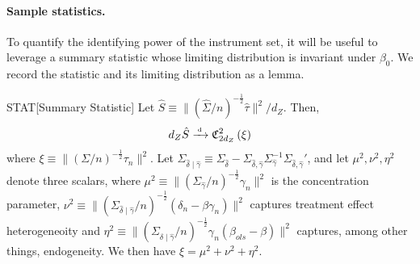 \paragraph*{Sample statistics.}
To quantify the identifying power of the instrument set, it will be useful to leverage a summary statistic whose limiting distribution is invariant under \(\beta_0\). We record the statistic and its limiting distribution as a lemma.
\begin{lemmap}{STAT}[Summary Statistic]\label{lem:stat}
Let \(\hat S \equiv \lVert (\hat\Sigma/n)^{-\frac{1}{2}}\hat \tau\rVert^2/d_Z\). 
Then,
\begin{align*}
    d_Z\hat S  \xrightarrow{{\scriptscriptstyle \mathrm{\;d\;}}} \mathfrak{C}^2_{2d_Z}\left(\xi\right)
\end{align*} 
where \(\xi \equiv \lVert (\Sigma/n)^{-\frac{1}{2}}\tau_n\rVert^2\). 
Let  \( \Sigma_{\hat\delta \mid \hat\gamma} \equiv  \Sigma_{\hat \delta} - \Sigma_{\hat \delta,\hat \gamma} \Sigma_{\hat \gamma}^{-1}\Sigma_{\hat \delta,\hat \gamma}' \), and let \(\mu^2, \nu^2, \eta^2\) denote three scalars, where \(\mu^2\equiv \lVert  (\Sigma_{\hat \gamma}/n)^{-\frac{1}{2}}\gamma_n\rVert^2\) is the concentration parameter, \(\nu^2 \equiv \lVert (\Sigma_{\hat\delta \mid \hat\gamma}/n)^{-\frac{1}{2}} (\delta_n-\beta\gamma_n)\rVert^2\) captures treatment effect heterogeneoity and \(\eta^2 \equiv\lVert (\Sigma_{\hat\delta \mid \hat\gamma}/n)^{-\frac{1}{2}}\gamma_n(\beta_{ols}-\beta)\rVert^2\) captures, among other things, endogeneity. We then have \(\xi = \mu^2 + \nu^2 + \eta^2\).

\end{lemmap}
